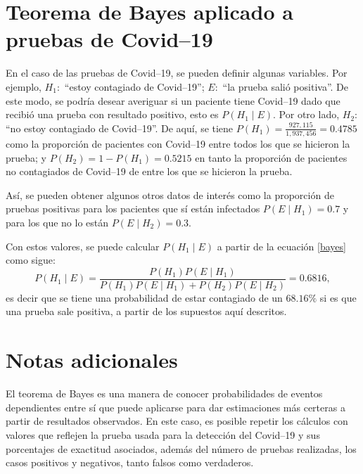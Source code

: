 \documentclass[paper=leter, fontsize=11pt]{scrartcl}
\numberwithin{equation}{section}		%
\numberwithin{figure}{section}			%
\numberwithin{table}{section}				%
\begin{document}
\section{Teorema de Bayes aplicado a pruebas de Covid--19}
En el caso de las pruebas de Covid--19, se pueden definir algunas variables. Por ejemplo, $H_1:$ ``estoy contagiado de Covid--19''; $E:$ ``la prueba salió positiva''. De este modo, se podría desear averiguar si un paciente tiene Covid--19 dado que recibió una prueba con resultado positivo, esto es $P(H_1 \mid E)$. Por otro lado, $H_2:$ ``no estoy contagiado de Covid--19''. De aquí, se tiene $P(H_1) = \frac{927,115}{1,937,456} = 0.4785$ como la proporción de pacientes con Covid--19 entre todos los que se hicieron la prueba; y $P(H_2) = 1 - P(H_1) = 0.5215$ en tanto la proporción de pacientes no contagiados de Covid--19 de entre los que se hicieron la prueba.

Así, se pueden obtener algunos otros datos de interés como la proporción de pruebas positivas para los pacientes que sí están infectados $P(E \mid H_1) = 0.7$ y para los que no lo están $P(E \mid H_2) = 0.3$.

Con estos valores, se puede calcular $P(H_1 \mid E)$ a partir de la ecuación \ref{bayes} como sigue:
\begin{equation*}
    P(H_1 \mid E) = \frac{P(H_1) P(E \mid H_1)}{P(H_1) P(E \mid H_1) + P(H_2) P(E \mid H_2)} = 0.6816,
\end{equation*}
es decir que se tiene una probabilidad de estar contagiado de un $68.16\%$ si es que una prueba sale positiva, a partir de los supuestos aquí descritos.

\section{Notas adicionales}
El teorema de Bayes es una manera de conocer probabilidades de eventos dependientes entre sí que puede aplicarse para dar estimaciones más certeras a partir de resultados observados. En este caso, es posible repetir los cálculos con valores que reflejen la prueba usada para la detección del Covid--19 y sus porcentajes de exactitud asociados, además del número de pruebas realizadas, los casos positivos y negativos, tanto falsos como verdaderos.



\end{document}
